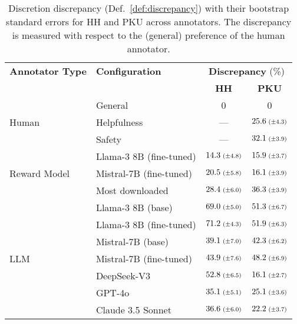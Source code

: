 \documentclass{article}
\begin{document}
\begin{table}[tb]
    \caption{Discretion discrepancy (Def.~\ref{def:discrepancy}) with their bootstrap standard errors for HH and PKU across annotators. The discrepancy is measured with respect to the (general) preference of the human annotator.}
    \label{table:discretion-hh-pku}
    \centering
    \small
    \begin{tabular}{llcc}
    \toprule
    \textbf{Annotator Type} & \textbf{Configuration} & \multicolumn{2}{c}{\textbf{Discrepancy} (\%)} \\
    \cmidrule(lr){3-4}
     &  & \textbf{HH} & \textbf{PKU} \\
    \midrule
    \multirow{3}{*}{Human} 
    & General & 0 & 0 \\
    & Helpfulness & --- & $25.6 \textrm{\scriptsize{ ($\pm$4.3)}}$ \\
    & Safety & --- & $32.1 \textrm{\scriptsize{ ($\pm$3.9)}}$ \\
    \midrule
    \multirow{3}{*}{Reward Model} 
    & Llama-3 8B (fine-tuned) & $14.3 \textrm{\scriptsize{ ($\pm$4.8)}}$ & $15.9 \textrm{\scriptsize{ ($\pm$3.7)}}$ \\
    & Mistral-7B (fine-tuned) & $20.5 \textrm{\scriptsize{ ($\pm$5.8)}}$ & $16.1 \textrm{\scriptsize{ ($\pm$3.9)}}$ \\
    & Most downloaded & $28.4 \textrm{\scriptsize{ ($\pm$6.0)}}$ & $36.3 \textrm{\scriptsize{ ($\pm$3.9)}}$ \\
    \midrule
    \multirow{7}{*}{LLM} 
    & Llama-3 8B (base) & $69.0 \textrm{\scriptsize{ ($\pm$5.0)}}$ & $51.3 \textrm{\scriptsize{ ($\pm$6.7)}}$ \\
    & Llama-3 8B (fine-tuned) & $71.2 \textrm{\scriptsize{ ($\pm$4.3)}}$ & $51.9 \textrm{\scriptsize{ ($\pm$6.3)}}$ \\
    & Mistral-7B (base) & $39.1 \textrm{\scriptsize{ ($\pm$7.0)}}$ & $42.3 \textrm{\scriptsize{ ($\pm$6.2)}}$ \\
    & Mistral-7B (fine-tuned) & $43.9 \textrm{\scriptsize{ ($\pm$7.6)}}$ & $48.2 \textrm{\scriptsize{ ($\pm$6.9)}}$ \\
    & DeepSeek-V3 & $52.8 \textrm{\scriptsize{ ($\pm$6.5)}}$ & $16.1 \textrm{\scriptsize{ ($\pm$2.7)}}$ \\
    & GPT-4o & $35.1 \textrm{\scriptsize{ ($\pm$5.1)}}$ & $25.1 \textrm{\scriptsize{ ($\pm$3.6)}}$ \\
    & Claude 3.5 Sonnet & $36.6 \textrm{\scriptsize{ ($\pm$6.0)}}$ & $22.2 \textrm{\scriptsize{ ($\pm$3.7)}}$ \\
    \bottomrule
\end{tabular}
\end{table}
\end{document}
